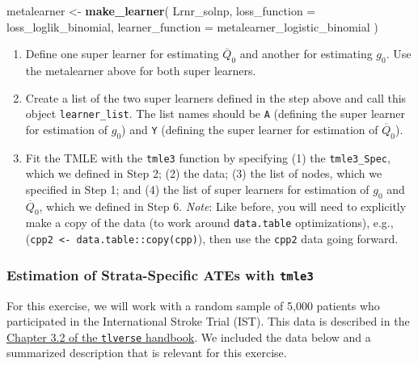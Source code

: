 \documentclass[12pt, krantz2,]{krantz}
\newenvironment{Shaded}{\begin{snugshade}}{\end{snugshade}}
\newcommand{\DataTypeTok}[1]{\textcolor[rgb]{0.27,0.27,0.27}{#1}}
\newcommand{\KeywordTok}[1]{\textcolor[rgb]{0.27,0.27,0.27}{\textbf{#1}}}
\newcommand{\NormalTok}[1]{#1}
\newcommand{\StringTok}[1]{\textcolor[rgb]{0.5,0.5,0.5}{#1}}
\providecommand{\tightlist}{%
  \setlength{\itemsep}{0pt}\setlength{\parskip}{0pt}}
\theoremstyle{definition}
\theoremstyle{definition}
\theoremstyle{definition}
\newcommand{\1}{\mathbbm{1}}
\begin{document}
\begin{Shaded}
\begin{Highlighting}[]
\NormalTok{metalearner <-}\StringTok{ }\KeywordTok{make_learner}\NormalTok{(}
\NormalTok{  Lrnr_solnp,}
  \DataTypeTok{loss_function =}\NormalTok{ loss_loglik_binomial,}
  \DataTypeTok{learner_function =}\NormalTok{ metalearner_logistic_binomial}
\NormalTok{)}
\end{Highlighting}
\end{Shaded}

\begin{enumerate}
\def\labelenumi{\arabic{enumi}.}
\setcounter{enumi}{4}
\tightlist
\item
  Define one super learner for estimating \(\overline{Q}_0\) and another for
  estimating \(g_0\). Use the metalearner above for both super learners.
\item
  Create a list of the two super learners defined in the step above and call
  this object \texttt{learner\_list}. The list names should be \texttt{A} (defining the super
  learner for estimation of \(g_0\)) and \texttt{Y} (defining the super learner for
  estimation of \(\overline{Q}_0\)).
\item
  Fit the TMLE with the \texttt{tmle3} function by specifying (1) the \texttt{tmle3\_Spec},
  which we defined in Step 2; (2) the data; (3) the list of nodes, which we
  specified in Step 1; and (4) the list of super learners for estimation of
  \(g_0\) and \(\overline{Q}_0\), which we defined in Step 6. \emph{Note}: Like before,
  you will need to explicitly make a copy of the data (to work around
  \texttt{data.table} optimizations), e.g., (\texttt{cpp2\ \textless{}-\ data.table::copy(cpp)}), then
  use the \texttt{cpp2} data going forward.
\end{enumerate}

\hypertarget{tmle3-ex2}{%
\subsubsection{\texorpdfstring{Estimation of Strata-Specific ATEs with \texttt{tmle3}}{Estimation of Strata-Specific ATEs with tmle3}}\label{tmle3-ex2}}

For this exercise, we will work with a random sample of 5,000 patients who
participated in the International Stroke Trial (IST). This data is described in
the \protect\hyperlink{ist}{Chapter 3.2 of the \texttt{tlverse} handbook}. We included the data below
and a summarized description that is relevant for this exercise.
\end{document}
